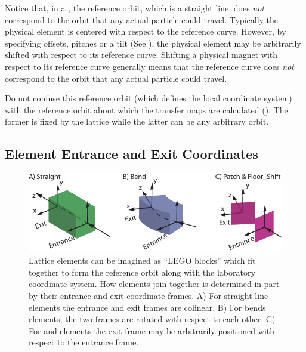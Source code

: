 Notice that, in a , the reference orbit, which is a straight line, does {\em not}
correspond to the orbit that any actual particle could travel. Typically the physical element is
centered with respect to the reference curve. However, by specifying offsets, pitches or a tilt (See
), the physical element may be arbitrarily shifted with respect to its reference
curve. Shifting a physical magnet with respect to its reference curve generally means that the
reference curve does {\em not} correspond to the orbit that any actual particle could travel.

Do not confuse this reference orbit (which defines the local coordinate system) with the reference
orbit about which the transfer maps are calculated (). The former is fixed by the
lattice while the latter can be any arbitrary orbit.

\subsection{Element Entrance and Exit Coordinates}
\label{s:ent.exi}


  \begin{figure}[tb]
  \centering
  \includegraphics[width=5in]{element-coord-frame.pdf}
\caption[Lattice elements as LEGO blocks.]{Lattice elements can be imagined as ``LEGO blocks'' which
fit together to form the reference orbit along with the laboratory coordinate system. How elements
join together is determined in part by their entrance and exit coordinate frames. A) For
straight line elements the entrance and exit frames are colinear. B) For bends elements, the two
frames are rotated with respect to each other. C) For  and  elements the
exit frame may be arbitrarily positioned with respect to the entrance frame.}
  \label{f:ele.coord.frame}
  \end{figure}

